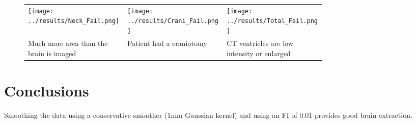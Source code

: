 \documentclass[final]{beamer}\usepackage[]{graphicx}\usepackage[]{color}
\begin{document}
\begin{frame}[fragile]
\begin{multicols}{2}
\begin{figure}
\centering
\begin{tabular}{>{\centering}m{0.25\linewidth}>{\centering}m{0.25\linewidth}>{\centering\arraybackslash}m{0.25\linewidth}}
\texttt{[image: ../results/Neck\_Fail.png]} &
\texttt{[image: ../results/Crani\_Fail.png]} & 
\texttt{[image: ../results/Total\_Fail.png]} \\
Much more area than the brain is imaged &
Patient had a craniotomy & 
CT ventricles are low intensity or enlarged 
\end{tabular}
\end{figure}


\section{Conclusions}
\vspace*{-0.5cm}
Smoothing the data using a conservative smoother ($1$mm Gaussian kernel) and using an FI of $0.01$ provides good brain extraction.








\end{multicols}

\end{frame}
\end{document}
